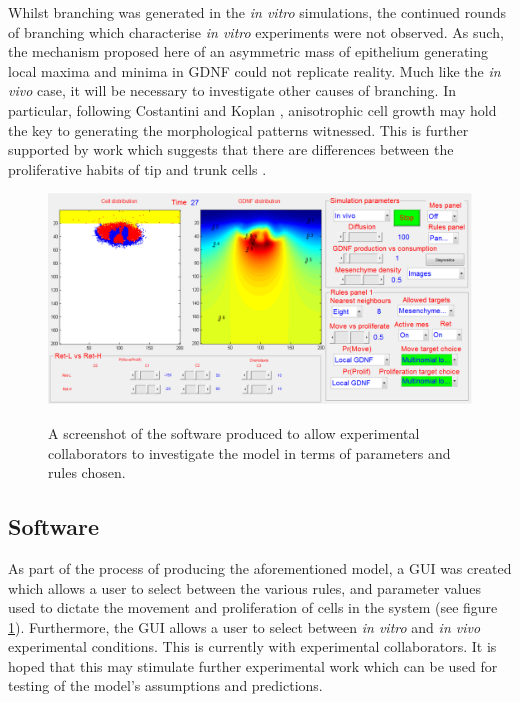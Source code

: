 \documentclass[pdftex,10pt,a4paper,twocolumn]{article}
\begin{document}
Whilst branching was generated in the \textit{in vitro} simulations, the continued rounds of branching which characterise \textit{in vitro} experiments were not observed. As such, the mechanism proposed here of an asymmetric mass of epithelium generating local maxima and minima in GDNF could not replicate reality. Much like the \textit{in vivo} case, it will be necessary to investigate other causes of branching. In particular, following Costantini and Koplan \cite{CostantiniFKopan2010}, anisotrophic cell growth may hold the key to generating the  morphological patterns witnessed. This is further supported by work which suggests that there are differences between the proliferative habits of tip and trunk cells \cite{packard2013luminal}.

\begin{figure}[t] 
\centering
\scalebox{0.9} 
{\includegraphics{gui_screenshot.eps}}
\caption{A screenshot of the software produced to allow experimental collaborators to investigate the model in terms of parameters and rules chosen.}\label{fig:gui}
\end{figure} 


\subsection{Software}
As part of the process of producing the aforementioned model, a GUI was created which allows a user to select between the various rules, and parameter values used to dictate the movement and proliferation of cells in the system (see figure \ref{fig:gui}). Furthermore, the GUI allows a user to select between \textit{in vitro} and \textit{in vivo} experimental conditions. This is currently with experimental collaborators. It is hoped that this may stimulate further experimental work which can be used for testing of the model's assumptions and predictions.
\end{document}
